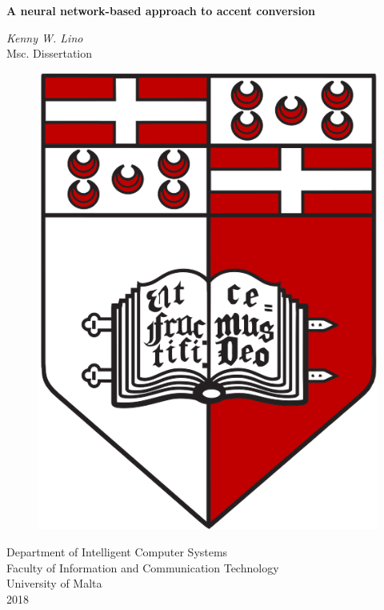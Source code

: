 \documentclass
[
    a4paper,
    twoside,
    12pt
]
{report}
\begin{document}
\begin{titlepage}
    \vspace*{1.0cm}
    \begin{center}
        \begin{Large}
        \textbf{A neural network-based approach to accent conversion} \\
        \end{Large}
        \vspace*{1.0cm}
        \textit{Kenny W. Lino} \\
        \vspace*{1.5cm}
        Msc. Dissertation \\
        \vspace*{0.5cm}
        \begin{figure}[H]
        \centering
        \includegraphics[scale=0.15]{img/UM-coat-of-arms.png}
    	\end{figure}
       \vspace*{1.0cm}
       Department of Intelligent Computer Systems \\
       Faculty of Information and Communication Technology \\
       University of Malta \\
       2018 \\
       

\end{center}
\end{titlepage}
\end{document}
